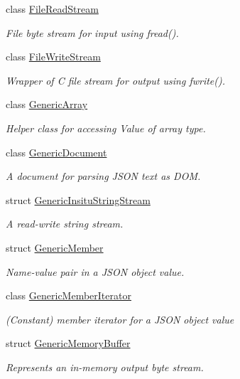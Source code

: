\begin{DoxyCompactItemize}
class \mbox{\hyperlink{classrapidjson_1_1_file_read_stream}{File\+Read\+Stream}}
\begin{DoxyCompactList}\small\item\em File byte stream for input using fread(). \end{DoxyCompactList}\item 
class \mbox{\hyperlink{classrapidjson_1_1_file_write_stream}{File\+Write\+Stream}}
\begin{DoxyCompactList}\small\item\em Wrapper of C file stream for output using fwrite(). \end{DoxyCompactList}\item 
class \mbox{\hyperlink{classrapidjson_1_1_generic_array}{Generic\+Array}}
\begin{DoxyCompactList}\small\item\em Helper class for accessing Value of array type. \end{DoxyCompactList}\item 
class \mbox{\hyperlink{classrapidjson_1_1_generic_document}{Generic\+Document}}
\begin{DoxyCompactList}\small\item\em A document for parsing J\+S\+ON text as D\+OM. \end{DoxyCompactList}\item 
struct \mbox{\hyperlink{structrapidjson_1_1_generic_insitu_string_stream}{Generic\+Insitu\+String\+Stream}}
\begin{DoxyCompactList}\small\item\em A read-\/write string stream. \end{DoxyCompactList}\item 
struct \mbox{\hyperlink{structrapidjson_1_1_generic_member}{Generic\+Member}}
\begin{DoxyCompactList}\small\item\em Name-\/value pair in a J\+S\+ON object value. \end{DoxyCompactList}\item 
class \mbox{\hyperlink{classrapidjson_1_1_generic_member_iterator}{Generic\+Member\+Iterator}}
\begin{DoxyCompactList}\small\item\em (Constant) member iterator for a J\+S\+ON object value \end{DoxyCompactList}\item 
struct \mbox{\hyperlink{structrapidjson_1_1_generic_memory_buffer}{Generic\+Memory\+Buffer}}
\begin{DoxyCompactList}\small\item\em Represents an in-\/memory output byte stream. \end{DoxyCompactList}\item 

\end{DoxyCompactItemize}
